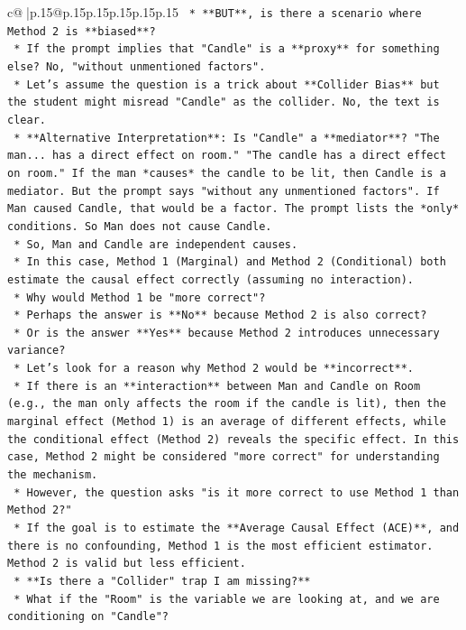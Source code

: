 \documentclass{article}
\begin{document}
{\begin{supertabular}{c@{$\;$}|p{.15\linewidth}@{}p{.15\linewidth}p{.15\linewidth}p{.15\linewidth}p{.15\linewidth}p{.15\linewidth}}
{{{\texttt{    *   **BUT**, is there a scenario where Method 2 is **biased**?} \\
\texttt{    *   If the prompt implies that "Candle" is a **proxy** for something else? No, "without unmentioned factors".} \\
\texttt{    *   Let's assume the question is a trick about **Collider Bias** but the student might misread "Candle" as the collider. No, the text is clear.} \\
\texttt{    *   **Alternative Interpretation**: Is "Candle" a **mediator**? "The man... has a direct effect on room." "The candle has a direct effect on room." If the man *causes* the candle to be lit, then Candle is a mediator. But the prompt says "without any unmentioned factors". If Man caused Candle, that would be a factor. The prompt lists the *only* conditions. So Man does not cause Candle.} \\
\texttt{    *   So, Man and Candle are independent causes.} \\
\texttt{    *   In this case, Method 1 (Marginal) and Method 2 (Conditional) both estimate the causal effect correctly (assuming no interaction).} \\
\texttt{    *   Why would Method 1 be "more correct"?} \\
\texttt{    *   Perhaps the answer is **No** because Method 2 is also correct?} \\
\texttt{    *   Or is the answer **Yes** because Method 2 introduces unnecessary variance?} \\
\texttt{    *   Let's look for a reason why Method 2 would be **incorrect**.} \\
\texttt{    *   If there is an **interaction** between Man and Candle on Room (e.g., the man only affects the room if the candle is lit), then the marginal effect (Method 1) is an average of different effects, while the conditional effect (Method 2) reveals the specific effect. In this case, Method 2 might be considered "more correct" for understanding the mechanism.} \\
\texttt{    *   However, the question asks "is it more correct to use Method 1 than Method 2?"} \\
\texttt{    *   If the goal is to estimate the **Average Causal Effect (ACE)**, and there is no confounding, Method 1 is the most efficient estimator. Method 2 is valid but less efficient.} \\
\texttt{    *   **Is there a "Collider" trap I am missing?**} \\
\texttt{    *   What if the "Room" is the variable we are looking at, and we are conditioning on "Candle"?} \\
}}}
\end{supertabular}}
\end{document}
